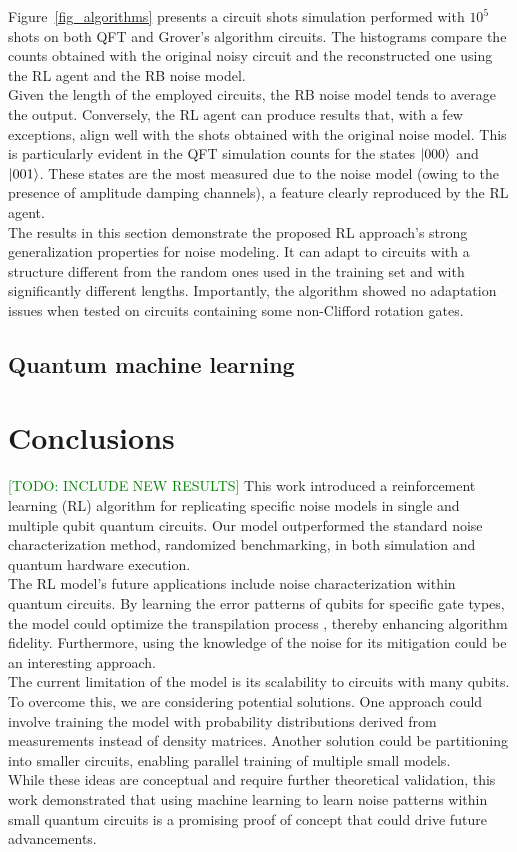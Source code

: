 \documentclass[sn-basic]{sn-jnl} %
\newcommand{\todo}[1]{\textcolor{green}{[TODO: #1]}}
\begin{document}
\noindent
Figure~\ref{fig_algorithms} presents a circuit shots simulation performed with $10^5$ shots on both QFT 
and Grover's algorithm circuits. The histograms compare the counts obtained with the original noisy circuit 
and the reconstructed one using the RL agent and the RB noise model.\\
Given the length of the employed circuits, the RB noise model tends to average the output. Conversely, the RL 
agent can produce results that, with a few exceptions, align well with the shots obtained with the original 
noise model. This is particularly evident in the QFT simulation counts for the states $\ket{000}$ and 
$\ket{001}$. These states are the most measured due to the noise model (owing to the presence of amplitude 
damping channels), a feature clearly reproduced by the RL agent.\\
The results in this section demonstrate the proposed RL approach's strong generalization properties for noise 
modeling. It can adapt to circuits with a structure different from the random ones used in the training set 
and with significantly different lengths. Importantly, the algorithm showed no adaptation issues when tested 
on circuits containing some non-Clifford rotation gates.

\subsection{Quantum machine learning}

\section{Conclusions}
\todo{INCLUDE NEW RESULTS}
This work introduced a reinforcement learning (RL) algorithm for replicating specific noise models in 
single and multiple qubit quantum circuits. Our model outperformed the standard noise characterization 
method, randomized benchmarking, in both simulation and quantum hardware execution.\\
The RL model's future applications include noise characterization within quantum circuits. By learning 
the error patterns of qubits for specific gate types, the model could optimize the transpilation process 
\cite{9259930}, thereby enhancing algorithm fidelity. Furthermore, using the knowledge of the noise for 
its mitigation could be an interesting approach.\\
The current limitation of the model is its scalability to circuits with many qubits. To overcome this, 
we are considering potential solutions. One approach could involve training the model with probability 
distributions derived from measurements instead of density matrices. Another solution could be partitioning 
into smaller circuits, enabling parallel training of multiple small models.\\
While these ideas are conceptual and require further theoretical validation, this work demonstrated that 
using machine learning to learn noise patterns within small quantum circuits is a promising proof of concept 
that could drive future advancements.
\end{document}
